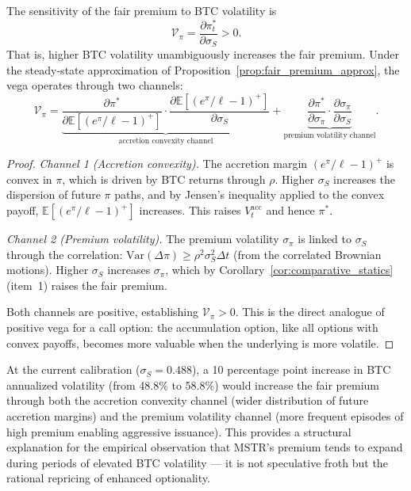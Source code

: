 \begin{proposition}
\label{prop:vega}
The sensitivity of the fair premium to BTC volatility is
\begin{equation}
\label{eq:vega_pi}
  \mathcal{V}_\pi = \frac{\partial \pi_t^*}{\partial \sigma_S} > 0.
\end{equation}
That is, higher BTC volatility unambiguously increases the fair premium. Under the steady-state approximation of Proposition~\ref{prop:fair_premium_approx}, the vega operates through two channels:
\begin{equation}
\label{eq:vega_channels}
  \mathcal{V}_\pi = \underbrace{\frac{\partial \pi^*}{\partial \mathbb{E}[(e^{\pi}/\ell - 1)^+]} \cdot \frac{\partial \mathbb{E}[(e^{\pi}/\ell - 1)^+]}{\partial \sigma_S}}_{\text{accretion convexity channel}} + \underbrace{\frac{\partial \pi^*}{\partial \sigma_\pi} \cdot \frac{\partial \sigma_\pi}{\partial \sigma_S}}_{\text{premium volatility channel}}.
\end{equation}
\end{proposition}

\begin{proof}
\emph{Channel 1 (Accretion convexity).} The accretion margin $(e^{\pi}/\ell - 1)^+$ is convex in $\pi$, which is driven by BTC returns through $\rho$. Higher $\sigma_S$ increases the dispersion of future $\pi$ paths, and by Jensen's inequality applied to the convex payoff, $\mathbb{E}[(e^{\pi}/\ell - 1)^+]$ increases. This raises $V_t^{\mathrm{acc}}$ and hence $\pi^*$.

\emph{Channel 2 (Premium volatility).} The premium volatility $\sigma_\pi$ is linked to $\sigma_S$ through the correlation: $\mathrm{Var}(\Delta\pi) \ge \rho^2 \sigma_S^2 \Delta t$ (from the correlated Brownian motions). Higher $\sigma_S$ increases $\sigma_\pi$, which by Corollary~\ref{cor:comparative_statics} (item~1) raises the fair premium.

Both channels are positive, establishing $\mathcal{V}_\pi > 0$. This is the direct analogue of positive vega for a call option: the accumulation option, like all options with convex payoffs, becomes more valuable when the underlying is more volatile.
\end{proof}

\begin{remark}
\label{rem:vega_quant}
At the current calibration ($\sigma_S = 0.488$), a 10 percentage point increase in BTC annualized volatility (from 48.8\% to 58.8\%) would increase the fair premium through both the accretion convexity channel (wider distribution of future accretion margins) and the premium volatility channel (more frequent episodes of high premium enabling aggressive issuance). This provides a structural explanation for the empirical observation that MSTR's premium tends to expand during periods of elevated BTC volatility --- it is not speculative froth but the rational repricing of enhanced optionality.
\end{remark}

